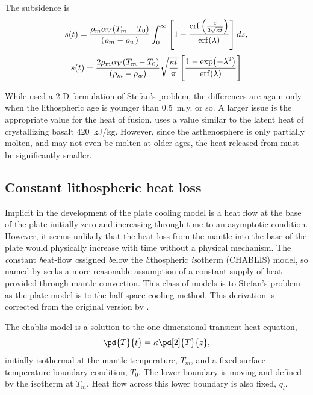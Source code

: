 \documentclass[final,12pt,a4paper]{article}
\begin{document}
The subsidence is 
\begin{equation}
    s(t) = \frac{\rho_{m} \alpha_{V}(T_{m} - T_{0})}{(\rho_{m} - \rho_{w})}
        \int_0^\infty \left[
        1 - \frac{\erf \left( \frac{z}{2\sqrt{\kappa t}} \right)}{\erf(\lambda)}
        \right] dz,
\end{equation}
\begin{equation}
    s(t) = \frac{2 \rho_{m} \alpha_{V}(T_{m} - T_{0})}{(\rho_{m} - \rho_{w})}
        \sqrt{\frac{\kappa t}{\pi}}
        \left[ \frac{1 - \exp(-\lambda^{2})}{\erf(\lambda)} \right]
\end{equation}

While \cite{Parker&Oldenburg1973} used a 2-D formulation of Stefan's
problem, the differences are again only when the lithospheric age is
younger than 0.5~m.y. or so.  A larger issue is the appropriate value
for the heat of fusion.  \cite{Parker&Oldenburg1973} uses a value
similar to the latent heat of crystallizing basalt 420~kJ/kg.  However,
since the asthenosphere is only partially molten, and may not even be
molten at older ages, the heat released from must be significantly
smaller.


\subsection{Constant lithospheric heat loss}
Implicit in the development of the plate cooling model is a heat flow at the
base of the plate initially zero and increasing through time to an asymptotic
condition.  However, it seems unlikely that the heat loss from the mantle into
the base of the plate would physically increase with time without a physical
mechanism.  The {\it c}\hspace{1pt}onstant {\it h}\hspace{1pt}eat-flow {\it
a}\hspace{1pt}ssigned {\it b}\hspace{1pt}elow the {\it l}\hspace{1pt}ithospheric
{\it is}\hspace{1pt}otherm (CHABLIS) model, so named by \cite{Doin&Fleitout1996}
seeks a more reasonable assumption of a constant supply of heat provided through
mantle convection.  This class of models is to Stefan's problem as the plate
model is to the half-space cooling method.  This derivation is corrected from
the original version by \citet{Hasterok2013a}.

The chablis model is a solution to the one-dimensional transient heat equation,
\begin{equation}
    \pd{T}{t} = \kappa \pd[2]{T}{z},
    \label{eq:pde}
\end{equation}
initially isothermal at the mantle temperature, $T_m$, and a fixed surface
temperature boundary condition, $T_{0}$.  The lower boundary is moving and
defined by the isotherm at $T_m$.  Heat flow across this lower boundary is also
fixed, $q_l$.
\end{document}

